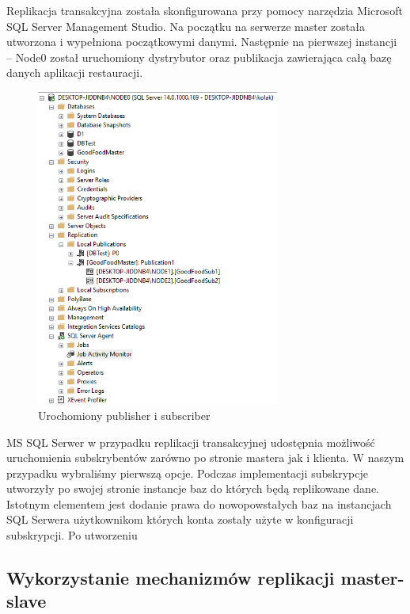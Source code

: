 \documentclass{article}
\begin{document}
	Replikacja transakcyjna została skonfigurowana przy pomocy narzędzia Microsoft SQL Server Management Studio. Na początku na serwerze master została utworzona i wypełniona początkowymi danymi. Następnie na pierwszej instancji – Node0 został uruchomiony dystrybutor oraz publikacja zawierająca całą bazę danych aplikacji restauracji.
	
	\begin{figure}[hbt!]
		\includegraphics[width=8cm]{Files/Pictures/postawionaReplikacja}
		\centering
		\caption{Urochomiony publisher i subscriber}
	\end{figure}
	
	MS SQL Serwer w przypadku replikacji transakcyjnej udostępnia możliwość uruchomienia subskrybentów zarówno po stronie mastera jak i klienta. W naszym przypadku wybraliśmy pierwszą opcje. Podczas implementacji subskrypcje utworzyły po swojej stronie instancje baz do których będą replikowane dane. Istotnym elementem jest dodanie prawa do nowopowstałych baz na instancjach SQL Serwera użytkownikom których konta zostały użyte w konfiguracji subskrypcji. Po utworzeniu 
	
	
	\newpage	
	\subsection{Wykorzystanie mechanizmów replikacji master-slave}
\end{document}
